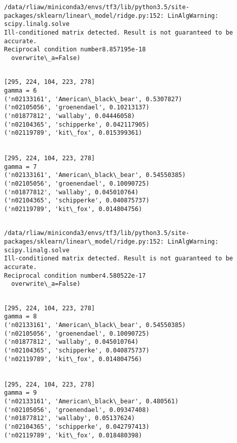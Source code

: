 \documentclass[11pt]{article}
\begin{document}
    \begin{Verbatim}[commandchars=\\\{\}]
/data/rliaw/miniconda3/envs/tf3/lib/python3.5/site-packages/sklearn/linear\_model/ridge.py:152: LinAlgWarning: scipy.linalg.solve
Ill-conditioned matrix detected. Result is not guaranteed to be accurate.
Reciprocal condition number8.857195e-18
  overwrite\_a=False)

    \end{Verbatim}

    \begin{Verbatim}[commandchars=\\\{\}]

[295, 224, 104, 223, 278]
gamma = 6
('n02133161', 'American\_black\_bear', 0.5307827)
('n02105056', 'groenendael', 0.10213137)
('n01877812', 'wallaby', 0.04446058)
('n02104365', 'schipperke', 0.042117905)
('n02119789', 'kit\_fox', 0.015399361)


[295, 224, 104, 223, 278]
gamma = 7
('n02133161', 'American\_black\_bear', 0.54550385)
('n02105056', 'groenendael', 0.10090725)
('n01877812', 'wallaby', 0.045010764)
('n02104365', 'schipperke', 0.040875737)
('n02119789', 'kit\_fox', 0.014804756)


    \end{Verbatim}

    \begin{Verbatim}[commandchars=\\\{\}]
/data/rliaw/miniconda3/envs/tf3/lib/python3.5/site-packages/sklearn/linear\_model/ridge.py:152: LinAlgWarning: scipy.linalg.solve
Ill-conditioned matrix detected. Result is not guaranteed to be accurate.
Reciprocal condition number4.580522e-17
  overwrite\_a=False)

    \end{Verbatim}

    \begin{Verbatim}[commandchars=\\\{\}]

[295, 224, 104, 223, 278]
gamma = 8
('n02133161', 'American\_black\_bear', 0.54550385)
('n02105056', 'groenendael', 0.10090725)
('n01877812', 'wallaby', 0.045010764)
('n02104365', 'schipperke', 0.040875737)
('n02119789', 'kit\_fox', 0.014804756)


[295, 224, 104, 223, 278]
gamma = 9
('n02133161', 'American\_black\_bear', 0.480561)
('n02105056', 'groenendael', 0.09347408)
('n01877812', 'wallaby', 0.05137624)
('n02104365', 'schipperke', 0.042797413)
('n02119789', 'kit\_fox', 0.018480398)


    \end{Verbatim}
\end{document}
